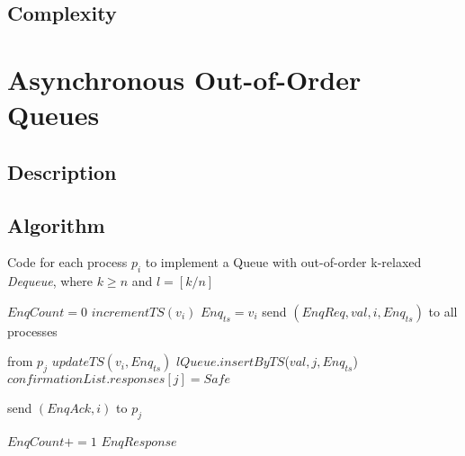 \documentclass[a4paper,USenglish]{lipics-v2021} %
\begin{document}
  

\subsection{Complexity}

\section{Asynchronous Out-of-Order Queues}

\subsection{Description}

\subsection{Algorithm}

\begin{algorithm}
  \caption{Code for each process $p_i$ to implement a Queue with out-of-order k-relaxed \textit{Dequeue}, where $k \geq n$ and $l = [k/n]$}
  \begin{algorithmic}[1]
      \State $EnqCount = 0$
      \State $incrementTS(v_i)$
      \State $Enq_{ts} = v_i$
      \State send $(EnqReq, val, i, Enq_{ts})$ to all processes
    \EndFunction

     from $p_j$
      \State $updateTS(v_i, Enq_{ts})$
      \State $lQueue.insertByTS$($val, j, Enq_{ts}$)
          \State $confirmationList.responses[j] = Safe$
        \EndIf
      \EndFor

      \State send $(EnqAck, i)$ to $p_j$
    \EndFunction

      \State $EnqCount += 1$
        \Return $EnqResponse$
      \EndIf
    \EndFunction

  \end{algorithmic}
\end{algorithm}
\end{document}
